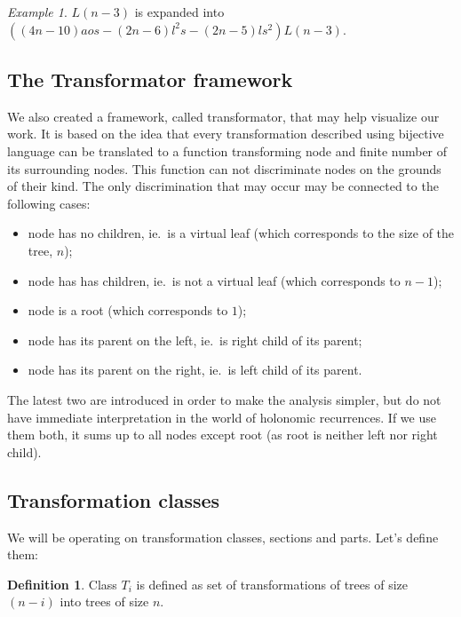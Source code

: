 \documentclass[final]{article}
\theoremstyle{definition}
\newtheorem{definition}{Definition}[subsection]
\theoremstyle{remark}
\newtheorem{example}{Example}[subsection]
\begin{document}
\begin{example}
    \(L(n-3)\) is expanded into \(((4 n - 10) a o s - (2 n - 6) l^2 s - (2 n - 5) l s^2) L(n - 3)\).
\end{example}


\subsection{The Transformator framework}%
\label{sub:the_framework}

We also created a framework, called transformator, that may help visualize our work. It is based on the idea that every transformation described using bijective language can be translated to a function transforming node and finite number of its surrounding nodes. This function can not discriminate nodes on the grounds of their kind. The only discrimination that may occur may be connected to the following cases:
\begin{itemize}
    \item node has no children, ie.~is a virtual leaf (which corresponds to the size of the tree, \(n\));
    \item node has has children, ie.~is not a virtual leaf (which corresponds to \(n - 1\));
    \item node is a root (which corresponds to \(1\));
    \item node has its parent on the left, ie.~is right child of its parent;
    \item node has its parent on the right, ie.~is left child of its parent.
\end{itemize}

The latest two are introduced in order to make the analysis simpler, but do not have immediate interpretation in the world of holonomic recurrences. If we use them both, it sums up to all nodes except root (as root is neither left nor right child).


\subsection{Transformation classes}%
\label{sub:transformation_classes}

We will be operating on transformation classes, sections and parts. Let's define them:

\begin{definition}
    Class \(T_i\) is defined as set of transformations of trees of size \((n - i)\) into trees of size \(n\).
\end{definition}
\end{document}

